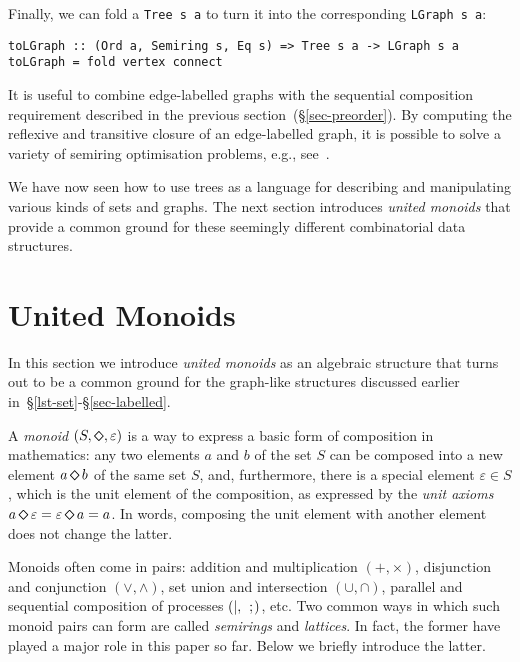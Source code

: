 \documentclass[english,submission]{programming}
\newcommand{\code}[1]{\lstinline[mathescape]|#1|}
\newcommand{\hcode}[1]{{\color{darkblue} \lstinline[keywordstyle={}]|#1|}} %
\newcommand{\dia}{\,\text{\raisebox{-0.3mm}{\Large $\diamond$}}\,}
\newcommand{\ldia}{\text{\raisebox{-0.3mm}{\Large $\diamond$}}}
\begin{document}
\noindent
Finally, we can fold a \hcode{Tree s a} to turn it into the corresponding
\hcode{LGraph s a}:

\begin{lstlisting}
toLGraph :: (Ord a, Semiring s, Eq s) => Tree s a -> LGraph s a
toLGraph = fold vertex connect
\end{lstlisting}

\noindent
It is useful to combine edge-labelled graphs with the sequential composition
requirement described in the previous section~(\S\ref{sec-preorder}). By
computing the reflexive and transitive closure of an edge-labelled graph, it is
possible to solve a variety of semiring optimisation problems, e.g.,
see~\cite{2013_semirings_dolan}\cite{mohri2002semiring}.

We have now seen how to use trees as a language for describing and manipulating
various kinds of sets and graphs. The next section introduces \emph{united
monoids} that provide a common ground for these seemingly different
combinatorial data structures.

\section{United Monoids}\label{sec-united}

In this section we introduce \emph{united monoids} as an algebraic structure
that turns out to be a common ground for the graph-like structures
discussed earlier in~\S\ref{lst-set}-\S\ref{sec-labelled}.

A \emph{monoid} $(S, \ldia, \varepsilon)$ is a way to express a basic form of
composition in mathematics: any two elements $a$ and $b$ of the set $S$ can be
composed into a new element $a \dia b$ of the same set $S$, and, furthermore,
there is a special element $\varepsilon \in S$, which is the unit element of the
composition, as expressed by the \emph{unit axioms}
$a \dia \varepsilon = \varepsilon \dia a = a$. In words, composing the unit
element with another element does not change the latter.

Monoids often come in pairs: addition and multiplication $(+, \times)$,
disjunction and conjunction $(\vee, \wedge)$, set union and intersection
$(\cup, \cap)$, parallel and sequential composition of processes
$(\text{\code{|}},\ \text{\code{;}})$, etc. Two common ways in which such monoid
pairs can form are called \emph{semirings} and \emph{lattices}. In fact, the
former have played a major role in this paper so far. Below we briefly introduce
the latter.
\end{document}
